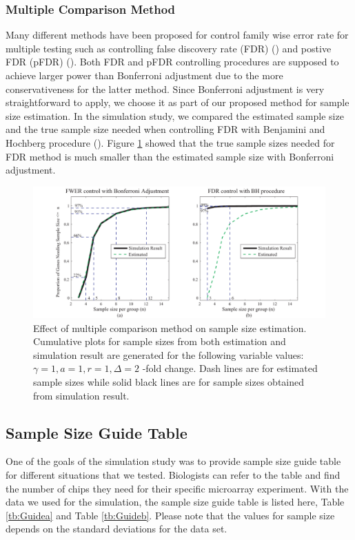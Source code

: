 \documentclass{bioinfo}
\begin{document}
\subsubsection{Multiple Comparison Method}

Many different methods have been proposed for control family wise error rate for multiple testing such as controlling false
discovery rate (FDR) (\citealp{Benjamini95}) and postive FDR (pFDR) (\citealp{Storey00}). Both FDR and pFDR controlling
procedures are supposed to achieve larger power than Bonferroni adjustment due to the more conservativeness for the latter
method. Since Bonferroni adjustment is very straightforward to apply, we choose it as part of our proposed method for sample
size estimation. In the simulation study, we compared the estimated sample size and the true sample size needed when
controlling FDR with Benjamini and Hochberg procedure (\citealp{Benjamini95}). Figure \ref{fig:ResMtd} showed that the true
sample sizes needed for FDR method is much smaller than the estimated sample size with Bonferroni adjustment.

\begin{figure}[h]
    \centerline{\includegraphics*[width=3.5 in]{ResMtd.pdf}}
    \caption[Effect of multiple comparison method on sample size estimation]
    {Effect of multiple comparison method on sample size estimation.
    Cumulative plots for sample sizes from both estimation and
    simulation result are generated for the following variable values: $\gamma = 1, a = 1, r = 1,
    \Delta = 2$ -fold change. Dash lines are for estimated sample sizes
    while solid black lines are for sample sizes obtained from simulation result.}
    \label{fig:ResMtd}
\end{figure}


\subsection{Sample Size Guide Table}

One of the goals of the simulation study was to provide sample
size guide table for different situations that we tested.
Biologists can refer to the table and find the number of chips
they need for their specific microarray experiment. With the data
we used for the simulation, the sample size guide table is listed
here, Table \ref{tb:Guidea} and Table \ref{tb:Guideb}. Please note
that the values for sample size depends on the standard deviations
for the data set.
\end{document}
